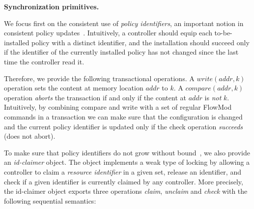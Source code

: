 \documentclass[conference]{sigcomm-alternate}
\newcommand{\hide}[1]{}
\newcommand{\claimcheck}{check\xspace}
\newcommand{\compare}{compare\xspace}
\newcommand{\addr}{\textit{addr}\xspace}
\newcommand{\petr}[1]{\textit{\textcolor{blue}{[petr]: #1}}} %
\begin{document}
\vspace{1mm}
\noindent\textbf{Synchronization primitives.}
%
\hide{

Our approach is based on the distributed management of \emph{identifiers (IDs)} \petr{unclear what "identifiers" mean here}. In particular,
we introduce two new synchronization objects (and describe their implementation in standard OpenFlow),
which allow controllers to coordinate
themselves based on these identifiers.

As we will see, in the OpenFlow implementation of our mechanism,
in addition to the ``normal'' configuration stored at the switch
(e.g., forwarding rules according to network policies),
controllers will maintain additional information
in the switch configuration: this information is used by the
controllers to synchronize.
\petr{"As we will see,..." - looks funny compared with "As we will see ..." at the end of Sec 2}
\subsection{Synchronization Objects}\label{sec:t-if}
}
%
We focus first on the consistent use of  \emph{policy identifiers},
an important notion in consistent policy updates~\cite{network-update,stn}.
Intuitively, a controller should
equip each to-be-installed policy with a distinct
identifier,
and the installation should succeed only if the identifier of the
currently installed policy has not changed since the last time the
controller read it.

Therefore, we provide the following transactional operations.
A $\textit{write}(\addr,k)$ operation sets the content at memory location
$\addr$ to $k$.
%
%
A $\textit{\compare}(\addr,k)$ operation \emph{aborts} the transaction
if and only if the content at
$\addr$ is \emph{not} $k$.
Intuitively, by combining compare and write with a set of regular
FlowMod commands in a transaction we can make sure that the
configuration is changed and the current policy identifier is updated
only if the check operation \emph{succeeds} (does not abort).

To make sure that policy identifiers do not grow without bound~\cite{stn}, we
also provide an \emph{id-claimer} object.
The object implements a weak type
of locking by allowing a controller to claim a \emph{resource identifier} in a
given set, release an identifier,  and check if a given identifier
is currently claimed by any controller.
%
More precisely, the id-claimer object exports three operations \emph{claim},
\emph{unclaim} and \emph{\claimcheck} with the following sequential
semantics:
\end{document}
